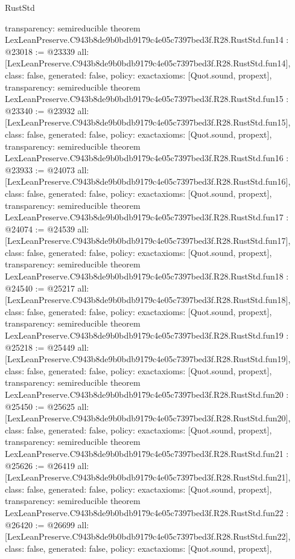 \begin{lexlean}{RustStd}
\begin{coremodule}
{  transparency: semireducible
}
theorem LexLeanPreserve.C943b8de9b0bdb9179c4e05c7397bed3f.R28.RustStd.fun14 : @23018 := @23339 {
  all: [LexLeanPreserve.C943b8de9b0bdb9179c4e05c7397bed3f.R28.RustStd.fun14],
  class: false,
  generated: false,
  policy: exact{axioms: [Quot.sound, propext]},
  transparency: semireducible
}
theorem LexLeanPreserve.C943b8de9b0bdb9179c4e05c7397bed3f.R28.RustStd.fun15 : @23340 := @23932 {
  all: [LexLeanPreserve.C943b8de9b0bdb9179c4e05c7397bed3f.R28.RustStd.fun15],
  class: false,
  generated: false,
  policy: exact{axioms: [Quot.sound, propext]},
  transparency: semireducible
}
theorem LexLeanPreserve.C943b8de9b0bdb9179c4e05c7397bed3f.R28.RustStd.fun16 : @23933 := @24073 {
  all: [LexLeanPreserve.C943b8de9b0bdb9179c4e05c7397bed3f.R28.RustStd.fun16],
  class: false,
  generated: false,
  policy: exact{axioms: [Quot.sound, propext]},
  transparency: semireducible
}
theorem LexLeanPreserve.C943b8de9b0bdb9179c4e05c7397bed3f.R28.RustStd.fun17 : @24074 := @24539 {
  all: [LexLeanPreserve.C943b8de9b0bdb9179c4e05c7397bed3f.R28.RustStd.fun17],
  class: false,
  generated: false,
  policy: exact{axioms: [Quot.sound, propext]},
  transparency: semireducible
}
theorem LexLeanPreserve.C943b8de9b0bdb9179c4e05c7397bed3f.R28.RustStd.fun18 : @24540 := @25217 {
  all: [LexLeanPreserve.C943b8de9b0bdb9179c4e05c7397bed3f.R28.RustStd.fun18],
  class: false,
  generated: false,
  policy: exact{axioms: [Quot.sound, propext]},
  transparency: semireducible
}
theorem LexLeanPreserve.C943b8de9b0bdb9179c4e05c7397bed3f.R28.RustStd.fun19 : @25218 := @25449 {
  all: [LexLeanPreserve.C943b8de9b0bdb9179c4e05c7397bed3f.R28.RustStd.fun19],
  class: false,
  generated: false,
  policy: exact{axioms: [Quot.sound, propext]},
  transparency: semireducible
}
theorem LexLeanPreserve.C943b8de9b0bdb9179c4e05c7397bed3f.R28.RustStd.fun20 : @25450 := @25625 {
  all: [LexLeanPreserve.C943b8de9b0bdb9179c4e05c7397bed3f.R28.RustStd.fun20],
  class: false,
  generated: false,
  policy: exact{axioms: [Quot.sound, propext]},
  transparency: semireducible
}
theorem LexLeanPreserve.C943b8de9b0bdb9179c4e05c7397bed3f.R28.RustStd.fun21 : @25626 := @26419 {
  all: [LexLeanPreserve.C943b8de9b0bdb9179c4e05c7397bed3f.R28.RustStd.fun21],
  class: false,
  generated: false,
  policy: exact{axioms: [Quot.sound, propext]},
  transparency: semireducible
}
theorem LexLeanPreserve.C943b8de9b0bdb9179c4e05c7397bed3f.R28.RustStd.fun22 : @26420 := @26699 {
  all: [LexLeanPreserve.C943b8de9b0bdb9179c4e05c7397bed3f.R28.RustStd.fun22],
  class: false,
  generated: false,
  policy: exact{axioms: [Quot.sound, propext]},
}
\end{coremodule}
\end{lexlean}
